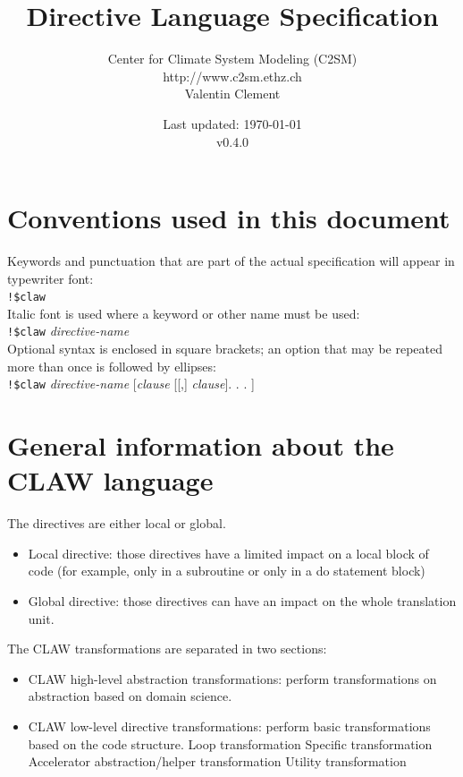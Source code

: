 \documentclass{article}
\title{\LARGE Directive Language Specification}
\author{Center for Climate System Modeling (C2SM)\\http://www.c2sm.ethz.ch\\Valentin Clement}
\date{Last updated: \today \\\vspace{1em}v0.4.0}
\begin{document}
\maketitle

\tableofcontents

\section*{Conventions used in this document}

Keywords and punctuation that are part of the actual specification will appear
in typewriter font: \\

\lstinline|!$claw|\\

Italic font is used where a keyword or other name must be used: \\

\lstinline|!$claw| \textit{directive-name}\\

Optional syntax is enclosed in square brackets; an option that may be repeated
more than once is followed by ellipses:\\

\lstinline|!$claw| \textit{directive-name} [\textit{clause}
[[,] \textit{clause}]. . . ]

\section{General information about the CLAW language}
The directives are either local or global.

\begin{itemize}
\item Local directive: those directives have a limited impact on a local block
of code (for example, only in a subroutine or only in a do statement block)
\item Global directive: those directives can have an impact on the whole
translation unit.
\end{itemize}

The CLAW transformations are separated in two sections:
\begin{itemize}
\item CLAW high-level abstraction transformations: perform transformations
on abstraction based on domain science.
\item CLAW low-level directive transformations: perform basic transformations
based on the code structure.
\subitem Loop transformation
\subitem Specific transformation
\subitem Accelerator abstraction/helper transformation
\subitem Utility transformation
\end{itemize}
\end{document}
